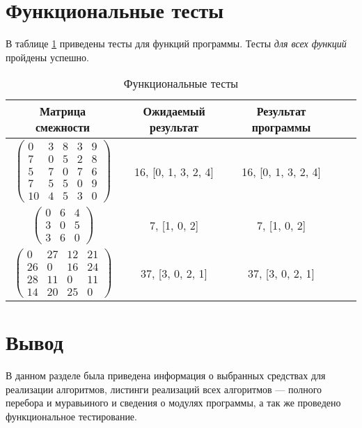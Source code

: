 \section{Функциональные тесты}

В таблице \ref{tbl:functional_test} приведены тесты для функций программы. Тесты \textit{для всех функций} пройдены успешно.

\begin{center}
    \captionsetup{justification=raggedright,singlelinecheck=off}
    \begin{longtable}[c]{|c|c|c|c|c|}
    \caption{Функциональные тесты\label{tbl:functional_test}} \\ \hline
		Матрица смежности & Ожидаемый результат & Результат программы \\
		\hline
		$ \begin{pmatrix}
			0 & 3 & 8 & 3 & 9 \\
			7 & 0 & 5 & 2 & 8 \\
			5 & 7 & 0 & 7 & 6 \\
			7 & 5 & 5 & 0 & 9 \\
			10 & 4 & 5 & 3 & 0 
		\end{pmatrix}$ &
		16, [0, 1, 3, 2, 4] &
		16, [0, 1, 3, 2, 4] \\
		\hline
		$ \begin{pmatrix}
			0 & 6 & 4 \\
			3 & 0 & 5 \\
			3 & 6 & 0	
		\end{pmatrix}$ &
		7, [1, 0, 2] &
		7, [1, 0, 2] \\
		\hline
		$ \begin{pmatrix}
			0 & 27 & 12 & 21 \\
			26 & 0 & 16 & 24 \\
			28 & 11 & 0 & 11 \\
			14 & 20 & 25 & 0 
		\end{pmatrix}$ &
		37, [3, 0, 2, 1] &
		37, [3, 0, 2, 1] \\
		\hline
	\end{longtable}
\end{center}

\section*{Вывод}

В данном разделе была приведена информация о выбранных средствах для реализации алгоритмов, листинги реализаций всех алгоритмов --- полного перебора и муравьиного и сведения о модулях программы, а так же проведено функциональное тестирование.
